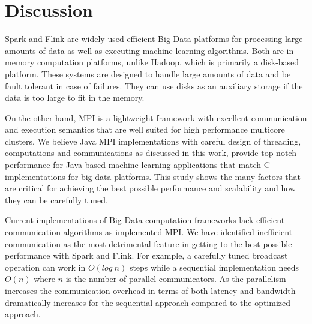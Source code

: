 \documentclass[10pt, conference, compsocconf]{IEEEtran}
\begin{document}

\section{Discussion}\label{sec:discussion}
Spark and Flink are widely used efficient Big Data platforms for processing large amounts of data as well as executing machine learning algorithms. Both are in-memory computation platforms, unlike Hadoop, which is primarily a disk-based platform. These systems are designed to handle large amounts of data and be fault tolerant in case of failures. They can use disks as an auxiliary storage if the data is too large to fit in the memory. 

On the other hand, \ac{MPI} is a lightweight framework with excellent communication and execution semantics that are well suited for high performance multicore clusters. We believe Java \ac{MPI} implementations with careful design of threading, computations and communications as discussed in this work, provide top-notch performance for Java-based machine learning applications that match C implementations for big data platforms. This study shows the many factors that are critical for achieving the best possible performance and scalability and how they can be carefully tuned. 

Current implementations of Big Data computation frameworks lack efficient communication algorithms as implemented \ac{MPI}. We have identified inefficient communication as the most detrimental feature in getting to the best possible performance with Spark and Flink. For example, a carefully tuned broadcast operation can work in $O(log\ n)$ steps while a sequential implementation needs $O(n)$ where $n$ is the number of parallel communicators. As the parallelism increases the communication overhead in terms of both latency and bandwidth dramatically increases for the sequential approach compared to the optimized approach.
\end{document}
